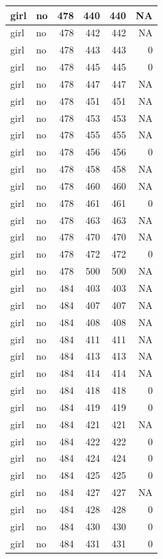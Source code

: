 \documentclass[man]{apa6}
\begin{document}
\begin{tabular}{l|l|r|r|r|r}
\hline
girl & no & 478 & 440 & 440 & NA\\
\hline
girl & no & 478 & 442 & 442 & NA\\
\hline
girl & no & 478 & 443 & 443 & 0\\
\hline
girl & no & 478 & 445 & 445 & 0\\
\hline
girl & no & 478 & 447 & 447 & NA\\
\hline
girl & no & 478 & 451 & 451 & NA\\
\hline
girl & no & 478 & 453 & 453 & NA\\
\hline
girl & no & 478 & 455 & 455 & NA\\
\hline
girl & no & 478 & 456 & 456 & 0\\
\hline
girl & no & 478 & 458 & 458 & NA\\
\hline
girl & no & 478 & 460 & 460 & NA\\
\hline
girl & no & 478 & 461 & 461 & 0\\
\hline
girl & no & 478 & 463 & 463 & NA\\
\hline
girl & no & 478 & 470 & 470 & NA\\
\hline
girl & no & 478 & 472 & 472 & 0\\
\hline
girl & no & 478 & 500 & 500 & NA\\
\hline
girl & no & 484 & 403 & 403 & NA\\
\hline
girl & no & 484 & 407 & 407 & NA\\
\hline
girl & no & 484 & 408 & 408 & NA\\
\hline
girl & no & 484 & 411 & 411 & NA\\
\hline
girl & no & 484 & 413 & 413 & NA\\
\hline
girl & no & 484 & 414 & 414 & NA\\
\hline
girl & no & 484 & 418 & 418 & 0\\
\hline
girl & no & 484 & 419 & 419 & 0\\
\hline
girl & no & 484 & 421 & 421 & NA\\
\hline
girl & no & 484 & 422 & 422 & 0\\
\hline
girl & no & 484 & 424 & 424 & 0\\
\hline
girl & no & 484 & 425 & 425 & 0\\
\hline
girl & no & 484 & 427 & 427 & NA\\
\hline
girl & no & 484 & 428 & 428 & 0\\
\hline
girl & no & 484 & 430 & 430 & 0\\
\hline
girl & no & 484 & 431 & 431 & 0\\

\end{tabular}
\end{document}
